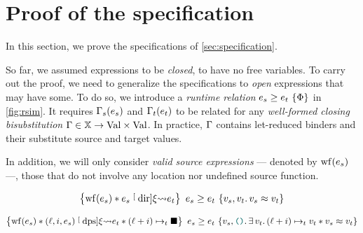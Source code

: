 \section{Proof of the specification}
\label{sec:proof}

In this section, we prove the specifications of \cref{sec:specification}.

So far, we assumed expressions to be \emph{closed}, \ie to have no free variables.
To carry out the proof, we need to generalize the specifications to \emph{open} expressions that may have some.
To do so, we introduce a \emph{runtime relation} $\iRsimv{\iPred}{\datalangExpr_s}{\datalangExpr_t}$ in \cref{fig:rsim}.
It requires $\datalangBisubst_s (\datalangExpr_s)$ and $\datalangBisubst_t (\datalangExpr_t)$ to be related for any \emph{well-formed closing bisubstitution} $\datalangBisubst \in \datalangVar[] \rightarrow \datalangVal[] \times \datalangVal[]$.
In practice, $\datalangBisubst$ contains let-reduced binders and their substitute source and target values.

In addition, we will only consider \emph{valid source expressions} --- denoted by $\wf{\datalangExpr_s}$ ---, \ie those that do not involve any location nor undefined source function.

\begin{lemma} \label{thm:dir}
    \[
        \iRsimvHoare{
            \wf{\datalangExpr_s} \iSep
            \datalangExpr_s \tmcDir{\datalangRenaming} \datalangExpr_t
        }{
            \datalangVal_s, \datalangVal_t \ldotp
            \datalangVal_s \iSimilar \datalangVal_t
        }{
            \datalangExpr_s
        }{
            \datalangExpr_t
        }
    \]
\end{lemma}

\begin{lemma} \label{thm:dps}
    \[
        \iRsimvHoare{
            \wf{\datalangExpr_s} \iSep
            (\datalangLoc, \datalangIdx, \datalangExpr_s) \tmcDps{\datalangRenaming} \datalangExpr_t \iSep
            (\datalangLoc + \datalangIdx) \iPointsto_t \datalangHole
        }{
            \datalangVal_s, \datalangUnit \ldotp
            \exists \datalangVal_t \ldotp
            (\datalangLoc + \datalangIdx) \iPointsto_t \datalangVal_t \iSep
            \datalangVal_s \iSimilar \datalangVal_t
        }{
            \datalangExpr_s
        }{
            \datalangExpr_t
        }
    \]
\end{lemma}

